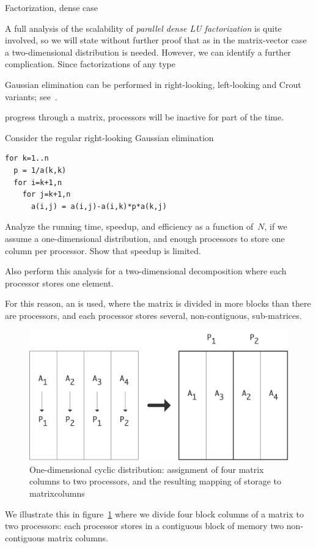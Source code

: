 
 {Factorization, dense case}
\label{sec:LUscaling}

A full analysis of the scalability of
%
\emph{parallel dense LU factorization}
%
is quite
involved, so we will state without further proof that as in the matrix-vector case a
two-dimensional distribution is needed. However, we can identify a
further complication. Since factorizations of any
type
\begin{footnoteenv}
  {Gaussian elimination can be performed in right-looking,
    left-looking and Crout variants; see~\cite{TSoPMC}.}
\end{footnoteenv}
progress through a matrix, processors will be inactive for part of the
time.

\begin{exercise}
  Consider the regular right-looking Gaussian elimination
\begin{verbatim}
for k=1..n
  p = 1/a(k,k)
  for i=k+1,n
    for j=k+1,n
      a(i,j) = a(i,j)-a(i,k)*p*a(k,j)
\end{verbatim}
  Analyze the running time, speedup, and efficiency as a function
  of~$N$, if we assume a one-dimensional distribution, and enough
  processors to store one column per processor. Show that speedup is
  limited.

  Also perform this analysis for a two-dimensional decomposition where
  each processor stores one element.
\end{exercise}


For this reason, an  is used, where
the matrix is divided in more blocks than there are processors,
and each processor stores several, non-contiguous, sub-matrices. 
\begin{figure}[ht]
  \includegraphics[scale=.11]{graphics/cyclic-1}
  \caption{One-dimensional cyclic distribution: assignment of four
    matrix columns to two processors, and the resulting mapping of
    storage to matrixcolumns}
  \label{fig:cyclic-1}
\end{figure}
We illustrate this in figure~\ref{fig:cyclic-1} where we divide four
block columns of a matrix to two processors: each processor stores in
a contiguous block of memory two non-contiguous matrix columns.


